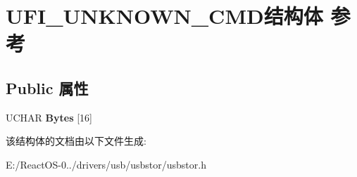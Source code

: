 \hypertarget{struct_u_f_i___u_n_k_n_o_w_n___c_m_d}{}\section{U\+F\+I\+\_\+\+U\+N\+K\+N\+O\+W\+N\+\_\+\+C\+M\+D结构体 参考}
\label{struct_u_f_i___u_n_k_n_o_w_n___c_m_d}
\subsection*{Public 属性}
\begin{DoxyCompactItemize}
\item 
\mbox{\label{struct_u_f_i___u_n_k_n_o_w_n___c_m_d_a7dba376c2724dacde8ce1f76b4a04623}} 
U\+C\+H\+AR {\bfseries Bytes} \mbox{[}16\mbox{]}
\end{DoxyCompactItemize}


该结构体的文档由以下文件生成\+:\begin{DoxyCompactItemize}
\item 
E\+:/\+React\+O\+S-\/0../drivers/usb/usbstor/usbstor.\+h\end{DoxyCompactItemize}
